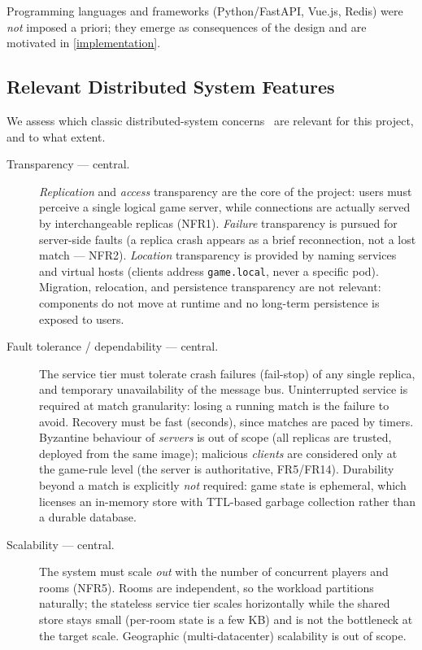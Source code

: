 \documentclass{scrartcl}
\begin{document}
Programming languages and frameworks (Python/FastAPI, Vue.js, Redis) were
\emph{not} imposed a priori; they emerge as consequences of the design and are
motivated in \cref{implementation}.

\subsection{Relevant Distributed System Features}\label{ds-features}

We assess which classic distributed-system
concerns~\cite{tanenbaum2017distributed} are relevant for this project, and to
what extent.

\begin{description}
      \item[Transparency --- central.] \emph{Replication} and \emph{access}
            transparency are the core of the project: users must perceive a single logical
            game server, while connections are actually served by interchangeable replicas
            (NFR1). \emph{Failure} transparency is pursued for server-side faults (a
            replica crash appears as a brief reconnection, not a lost match --- NFR2).
            \emph{Location} transparency is provided by naming services and virtual hosts
            (clients address \texttt{game.local}, never a specific pod). Migration,
            relocation, and persistence transparency are not relevant: components do not
            move at runtime and no long-term persistence is exposed to users.

      \item[Fault tolerance / dependability --- central.] The service tier must
            tolerate crash failures (fail-stop) of any single replica, and temporary
            unavailability of the message bus. Uninterrupted service is required at match
            granularity: losing a running match is the failure to avoid. Recovery must be
            fast (seconds), since matches are paced by timers. Byzantine behaviour of
            \emph{servers} is out of scope (all replicas are trusted, deployed from the
            same image); malicious \emph{clients} are considered only at the game-rule
            level (the server is authoritative, FR5/FR14). Durability beyond a match is
            explicitly \emph{not} required: game state is ephemeral, which licenses an
            in-memory store with TTL-based garbage collection rather than a durable
            database.

      \item[Scalability --- central.] The system must scale \emph{out} with the
            number of concurrent players and rooms (NFR5). Rooms are independent, so the
            workload partitions naturally; the stateless service tier scales horizontally
            while the shared store stays small (per-room state is a few KB) and is not the
            bottleneck at the target scale. Geographic (multi-datacenter) scalability is
            out of scope.


\end{description}
\end{document}

